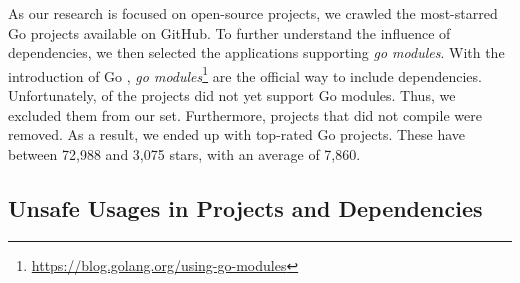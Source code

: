 As our research is focused on open-source projects, we crawled the \initalProjs{} most-starred Go projects available on GitHub. 
To further understand the influence of dependencies, we then selected the applications supporting \textit{go modules}.
With the introduction of Go , \textit{go modules}\footnote{\url{https://blog.golang.org/using-go-modules}} are the official way to include dependencies.
Unfortunately, \withoutModules{} of the projects did not yet support Go modules.
Thus, we excluded them from our set.
Furthermore, \notCompiled{} projects that did not compile were removed.
As a result, we ended up with \projsAnalyzed{} top-rated Go projects. %
These have between 72,988 and 3,075 stars, with an average of 7,860. %




\subsection{Unsafe Usages in Projects and Dependencies}

